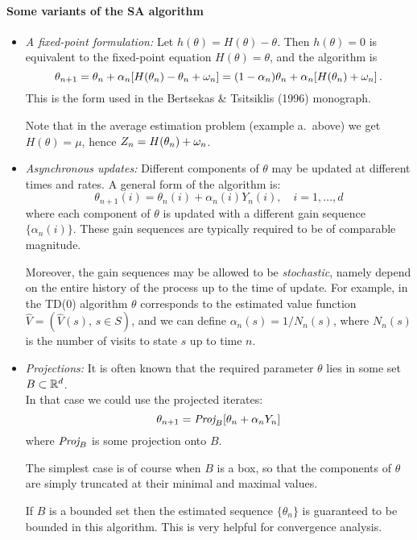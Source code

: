 \paragraph{Some variants of the SA algorithm}
\begin{itemize}
\item
{\em A fixed-point formulation:}
Let $h(\theta) = H(\theta) - \theta$. Then
$h(\theta) = 0$ is equivalent to the fixed-point equation
$H(\theta) = \theta$,  and the algorithm is
$$
\theta_{n+1} = \theta_n + \alpha_n [H(\theta_n) - \theta_n + \omega_n] =
(1-\alpha_n) \theta_n + \alpha_n [H(\theta_n) + \omega_n]\,.
$$
This is the form used in the Bertsekas \& Tsitsiklis (1996) monograph.

Note that in the average estimation problem (example a.~above) we get
$H(\theta)=\mu$, hence $Z_n=H(\theta_n) + \omega_n$.

\item
{\em Asynchronous updates:}
Different components of $\theta$ may be updated at different times and rates.
A general form of the algorithm is:
$$
\theta_{n+1} (i) = \theta_n(i) + \alpha_n(i) Y_n(i), \quad i=1, \dots, d
$$
where each component of $\theta$ is updated with a different gain sequence
$\{\alpha_n(i)\}$. These gain sequences are typically required to be
of comparable magnitude.

Moreover, the gain sequences may be allowed to be {\em stochastic},
namely depend on the entire history of the process up to the time of update.
For example, in the TD(0) algorithm $\theta$ corresponds to the estimated
value function
$\hat V=(\hat V(s),\,s\in S)$, and we can define $\alpha_n(s)=1/N_n(s)$,
where $N_n(s)$ is the number of visits to state $s$ up to time $n$.

\item
{\em Projections:}
It is often known that the required parameter $\theta$ lies in some set
$B\subset \mathbb{R}^d$.\\
In that case we could use the projected iterates:
$$
\theta_{n+1} = \text{\it Proj}_B [\theta_n + \alpha_n Y_n]
$$
where $\text{\it Proj}_B$ is some projection onto $B$.

The simplest case is of course when $B$ is a box, so that the components
of $\theta$ are simply truncated at their minimal and maximal values.

If $B$ is a bounded set then the estimated sequence $\{\theta_n\}$ is guaranteed
to be bounded in this algorithm. This is very helpful for convergence analysis.

\end{itemize}


